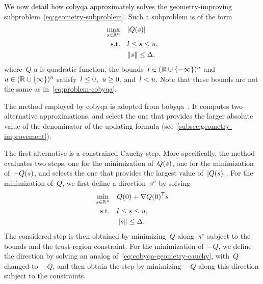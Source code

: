 We now detail how \gls{cobyqa} approximately solves the geometry-improving subproblem~\cref{eq:geometry-subproblem}.
Such a subproblem is of the form
\begin{subequations}
    \label{eq:geometry-simple}
    \begin{align}
        \max_{\sstep \in \R^n}  & \quad \abs{Q(\sstep)}\\
        \text{s.t.}             & \quad \xl \le \sstep \le \xu,\\
                                & \quad \norm{\sstep} \le \rad,
    \end{align}
\end{subequations}
where~$Q$ a is quadratic function, the bounds~$l \in (\mathbb{R} \cup \{-\infty\})^n$ and~$u \in (\mathbb{R} \cup \{\infty\})^n$ satisfy~$l \le 0$,~$u \ge 0$, and~$l < u$.
Note that these bounds are not the same as in~\cref{eq:problem-cobyqa}.

The method employed by \gls{cobyqa} is adopted from \gls{bobyqa}~\cite{Powell_2009}.
It computes two alternative approximations, and select the one that provides the larger absolute value of the denominator of the updating formula (see~\cref{subsec:geometry-improvement}).

The first alternative is a constrained Cauchy step.
More specifically, the method evaluates two steps, one for the minimization of~$Q(\sstep)$, one for the minimization of~$-Q(\sstep)$, and selects the one that provides the largest value of~$\abs{Q(\sstep)}$.
For the minimization of~$Q$, we first define a direction~$\sstep[c]$ by solving
\begin{subequations}
    \label{eq:cobyqa-geometry-cauchy}
    \begin{align}
        \min_{\sstep \in \R^n}  & \quad Q(0) + \nabla Q(0)^{\T} \sstep\\
        \text{s.t.}             & \quad \xl \le \sstep \le \xu,\\
                                & \quad \norm{\sstep} \le \rad.
    \end{align}
\end{subequations}
The considered step is then obtained by minimizing~$Q$ along~$\sstep[c]$ subject to the bounds and the trust-region constraint.
For the minimization of~$-Q$, we define the direction by solving an analog of~\cref{eq:cobyqa-geometry-cauchy}, with~$Q$ changed to~$-Q$, and then obtain the step by minimizing~$-Q$ along this direction subject to the constraints.

